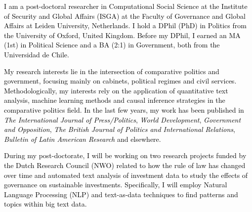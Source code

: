 




\vspace{3mm}

\begin{cvparagraph}

\textcolor{black}{I am a post-doctoral researcher in Computational Social Science at the Institute of Security and Global Affairs (ISGA) at the Faculty of Governance and Global Affairs at Leiden University, Netherlands. I hold a DPhil (PhD) in Politics from the University of Oxford, United Kingdom. Before my DPhil, I earned an MA (1st) in Political Science and a BA (2:1) in Government, both from the Universidad de Chile.}

\textcolor{black}{My research interests lie in the intersection of comparative politics and government, focusing mainly on cabinets, political regimes and civil services. Methodologically, my interests rely on the application of quantitative text analysis, machine learning methods and causal inference strategies in the comparative politics field. In the last few years, my work has been published in {\itshape The International Journal of Press/Politics}, {\itshape World Development}, {\itshape Government and Opposition}, {\itshape The British Journal of Politics and International Relations}, {\itshape Bulletin of Latin American Research} and elsewhere.}

\textcolor{black}{During my post-doctorate, I will be working on two research projects funded by the Dutch Research Council (NWO) related to how the rule of law has changed over time and automated text analysis of investment data to study the effects of governance on sustainable investments. Specifically, I will employ Natural Language Processing (NLP) and text-as-data techniques to find patterns and topics within big text data.}
\vspace{1mm}
\end{cvparagraph}
